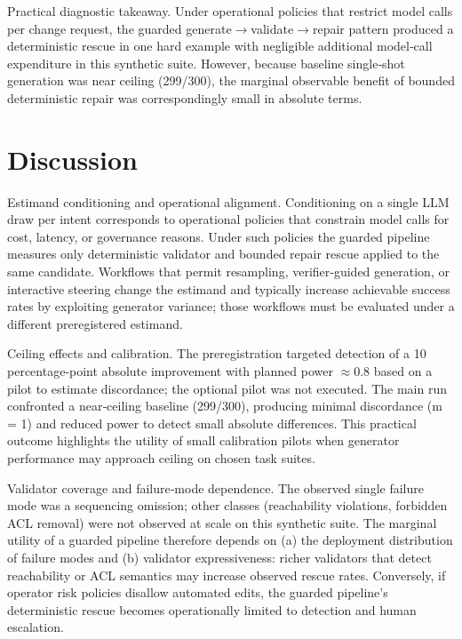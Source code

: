 \documentclass[conference]{IEEEtran}
\begin{document}
Practical diagnostic takeaway. Under operational policies that restrict model calls per change request, the guarded generate\ensuremath{\rightarrow}validate\ensuremath{\rightarrow}repair pattern produced a deterministic rescue in one hard example with negligible additional model‑call expenditure in this synthetic suite. However, because baseline single‑shot generation was near ceiling (299/300), the marginal observable benefit of bounded deterministic repair was correspondingly small in absolute terms.

\section{Discussion}
Estimand conditioning and operational alignment. Conditioning on a single LLM draw per intent corresponds to operational policies that constrain model calls for cost, latency, or governance reasons. Under such policies the guarded pipeline measures only deterministic validator and bounded repair rescue applied to the same candidate. Workflows that permit resampling, verifier‑guided generation, or interactive steering change the estimand and typically increase achievable success rates by exploiting generator variance; those workflows must be evaluated under a different preregistered estimand.

Ceiling effects and calibration. The preregistration targeted detection of a 10 percentage‑point absolute improvement with planned power \ensuremath{\approx}0.8 based on a pilot to estimate discordance; the optional pilot was not executed. The main run confronted a near‑ceiling baseline (299/300), producing minimal discordance (m = 1) and reduced power to detect small absolute differences. This practical outcome highlights the utility of small calibration pilots when generator performance may approach ceiling on chosen task suites.

Validator coverage and failure‑mode dependence. The observed single failure mode was a sequencing omission; other classes (reachability violations, forbidden ACL removal) were not observed at scale on this synthetic suite. The marginal utility of a guarded pipeline therefore depends on (a) the deployment distribution of failure modes and (b) validator expressiveness: richer validators that detect reachability or ACL semantics may increase observed rescue rates. Conversely, if operator risk policies disallow automated edits, the guarded pipeline's deterministic rescue becomes operationally limited to detection and human escalation.
\end{document}
